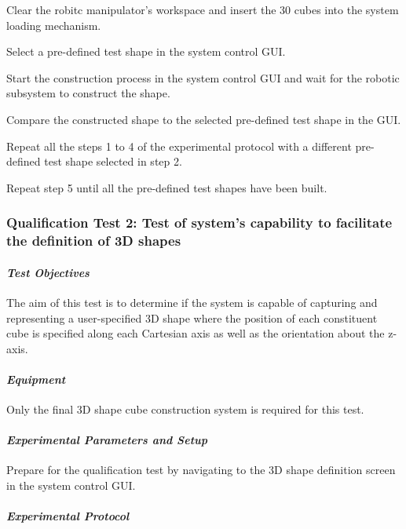 \begin{compactenum}
	\item Clear the robitc manipulator's workspace and insert the 30 cubes into the system loading mechanism.
	\item Select a pre-defined test shape in the system control GUI.
	\item Start the construction process in the system control GUI and wait for the robotic subsystem to construct the shape.
	\item Compare the constructed shape to the selected pre-defined test shape in the GUI.
	\item Repeat all the steps 1 to 4 of the experimental protocol with a different pre-defined test shape selected in step 2. 
	\item Repeat step 5 until all the pre-defined test shapes have been built.
\end{compactenum}

\subsubsection{Qualification Test 2: Test of system's capability to facilitate the definition of 3D shapes}

\paragraph{\textit{Test Objectives}} 

The aim of this test is to determine if the system is capable of capturing and representing a user-specified 3D shape where the position of each constituent cube is specified along each Cartesian axis as well as the orientation about the z-axis.

\paragraph{\textit{Equipment}} 

Only the final 3D shape cube construction system is required for this test.

\paragraph{\textit{Experimental Parameters and Setup}}

Prepare for the qualification test by navigating to the 3D shape definition screen in the system control GUI.

\paragraph{\textit{Experimental Protocol}}


